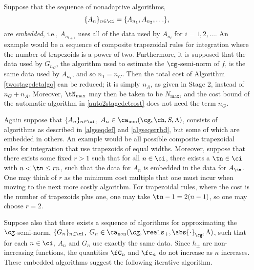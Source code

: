\documentclass[]{elsarticle}
\DeclareMathOperator{\fix}{non}
\theoremstyle{definition}
\theoremstyle{remark}
\newcommand{\Gnorm}[1]{\abs{#1}_{\cg}}
\begin{document}
Suppose that the sequence of nonadaptive algorithms, 
\[
\{A_n\}_{n \in \ci} = \{A_{n_1}, A_{n_2}, \ldots \}, 
\]
are \emph{embedded}, i.e., $A_{n_{i+1}}$ uses all of the data used by $A_{n_{i}}$ for $i=1, 2, \ldots$.  An example would be a sequence of composite trapezoidal rules for integration where the number of trapezoids is a power of two. Furthermore, it is supposed that the data used by $G_{n_G}$, the algorithm used to estimate the $\cg$-semi-norm of $f$, is the same data used by $A_{n_1}$, and so $n_1=n_G$.  Then the total cost of Algorithm \ref{twostagedetalgo} can be reduced; it is simply $n_A$, as given in Stage 2, instead of $n_G+n_A$.  Moreover, $\tN_{\max}$ may then be taken to be $N_{\max}$, and the cost bound of the automatic algorithm in \eqref{auto2stagedetcost} does not need the term $n_G$.

Again suppose that $\{A_n\}_{n \in \ci}$, $A_n  \in \ca_{\fix}(\cg,\ch,S,\Lambda)$, consists of algorithms as described in  \eqref{algseqdef} and \eqref{algseqerrbd}, but some of which are embedded in others.  An example would be all possible composite trapezoidal rules for integration that use trapezoids of equal widths.   Moreover, suppose that there exists some fixed $r > 1$ such that for all $n \in \ci$, there exists a $\tn \in \ci$ with $n < \tn \le rn$, such that the data for $A_n$ is embedded in the data for $A_{\tn}$. One may think of $r$ as the minimum cost multiple that one must incur when moving to the next more costly algorithm. For trapezoidal rules, where the cost is the number of trapezoids plus one, one may take $\tn-1=2(n-1)$, so one may choose $r=2$.

Suppose also that there exists a sequence of algorithms for approximating the $\cg$-semi-norm, $\{G_n\}_{n \in \ci}$, $G_n  \in \ca_{\fix}(\cg,\reals_+,\Gnorm{\cdot},\Lambda)$, such that for each $n \in \ci$, $A_n$ and $G_n$ use exactly the same data.
Since $h_{\pm}$ are non-increasing functions, the quantities $\fC_{n}$ and $\fc_n$ do not increase as $n$ increases. These embedded algorithms suggest the following iterative algorithm.
\end{document}

